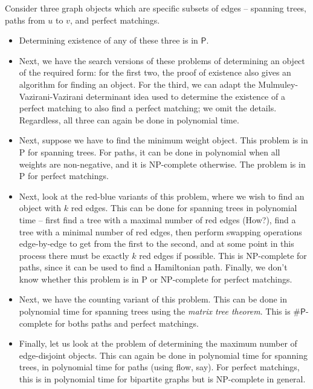 

Consider three graph objects which are specific subsets of edges -- spanning trees, paths from $u$ to $v$, and perfect matchings. 

\begin{itemize}
	\item Determining existence of any of these three is in $\mathsf{P}$.
	\item Next, we have the search versions of these problems of determining an object of the required form: for the first two, the proof of existence also gives an algorithm for finding an object. For the third, we can adapt the Mulmuley-Vazirani-Vazirani determinant idea used to determine the existence of a perfect matching to also find a perfect matching; we omit the details. Regardless, all three can again be done in polynomial time.
	\item Next, suppose we have to find the minimum weight object. This problem is in \textsf{P} for spanning trees. For paths, it can be done in polynomial when all weights are non-negative, and it is \textsf{NP}-complete otherwise. The problem is in \textsf{P} for perfect matchings.
	\item Next, look at the red-blue variants of this problem, where we wish to find an object with $k$ red edges. This can be done for spanning trees in polynomial time -- first find a tree with a maximal number of red edges (How?), find a tree with a minimal number of red edges, then perform swapping operations edge-by-edge to get from the first to the second, and at some point in this process there must be exactly $k$ red edges if possible. This is \textsf{NP}-complete for paths, since it can be used to find a Hamiltonian path. Finally, we don't know whether this problem is in \textsf{P} or \textsf{NP}-complete for perfect matchings.
	\item Next, we have the counting variant of this problem. This can be done in polynomial time for spanning trees using the \emph{matrix tree theorem}. This is $\#\mathsf{P}$-complete for boths paths and perfect matchings.
	\item Finally, let us look at the problem of determining the maximum number of edge-disjoint objects. This can again be done in polynomial time for spanning trees, in polynomial time for paths (using flow, say). For perfect matchings, this is in polynomial time for bipartite graphs but is \textsf{NP}-complete in general.
\end{itemize}

